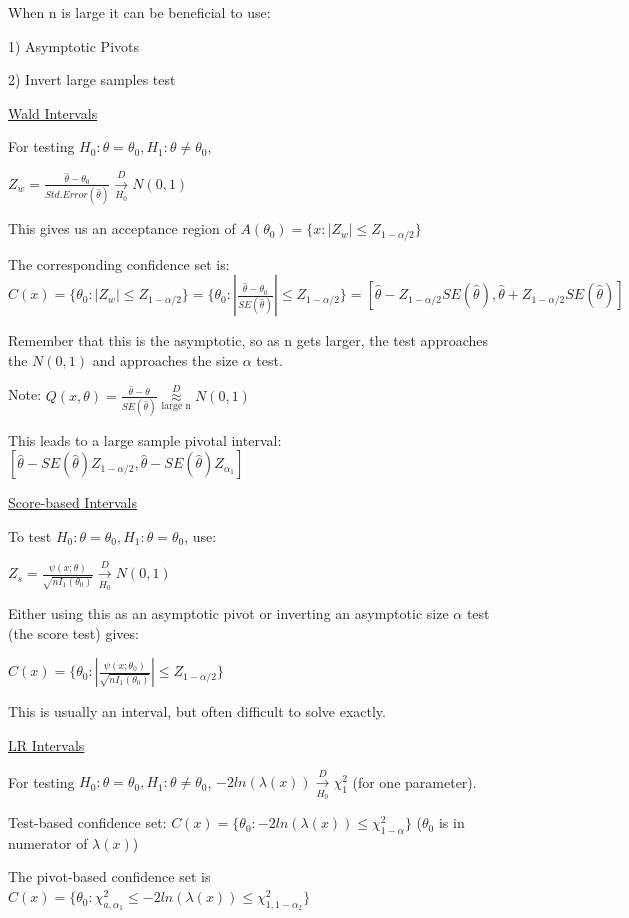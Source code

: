 \documentclass{article}
\newcommand{\dto}{\overset{D}{\to}}
\begin{document}
When n is large it can be beneficial to use:

1) Asymptotic Pivots

2) Invert large samples test

\underline{Wald Intervals}

For testing $H_0:\theta=\theta_0, H_1:\theta \neq \theta_0$, 

$Z_w = \frac{\hat{\theta} - \theta_0}{Std.Error(\hat{\theta})} \underset{H_0}{\dto} N(0,1)$

This gives us an acceptance region of $A(\theta_0) = \{x: |Z_w| \le Z_{1-\alpha/2}\}$

The corresponding confidence set is: $C(x) = \{\theta_0: |Z_w| \le Z_{1-\alpha/2}\} = \{\theta_0: |\frac{\hat{\theta} - \theta_0}{SE(\hat{\theta})}| \le Z_{1-\alpha/2}\} = [\hat{\theta} - Z_{1-\alpha/2}SE(\hat{\theta}), \hat{\theta} + Z_{1-\alpha/2}SE(\hat{\theta})]$

Remember that this is the asymptotic, so as n gets larger, the test approaches the $N(0,1)$ and approaches the size $\alpha$ test.

Note: $Q(x,\theta) = \frac{\hat{\theta} - \theta}{SE(\hat{\theta})} \underset{\text{large n}}{\overset{D}{\approx}} N(0,1)$

This leads to a large sample pivotal interval: $[\hat{\theta} - SE(\hat{\theta})Z_{1-\alpha/2}, \hat{\theta} - SE(\hat{\theta})Z_{\alpha_1}]$

\underline{Score-based Intervals}

To test $H_0: \theta = \theta_0, H_1: \theta = \theta_0$, use:

$Z_s = \frac{\psi(x;\theta)}{\sqrt{n I_1(\theta_0)}} \underset{H_0}{\dto} N(0,1)$

Either using this as an asymptotic pivot or inverting an asymptotic size $\alpha$ test (the score test) gives:

$C(x) = \{\theta_0: |\frac{\psi(x;\theta_0)}{\sqrt{n I_1(\theta_0)}}| \le Z_{1-\alpha/2}\}$

This is usually an interval, but often difficult to solve exactly. 

\underline{LR Intervals}

For testing $H_0: \theta = \theta_0, H_1:\theta \neq \theta_0$, $-2 ln(\lambda(x)) \underset{H_0}{\dto} \chi^2_1$ (for one parameter).

Test-based confidence set: $C(x) = \{\theta_0: -2ln(\lambda(x)) \le \chi^2_{1-\alpha}\}$ ($\theta_0$ is in numerator of $\lambda(x)$)

The pivot-based confidence set is $C(x) = \{\theta_0: \chi^2_{a,\alpha_1} \le -2ln(\lambda(x)) \le \chi^2_{1,1-\alpha_2}\}$
\end{document}
